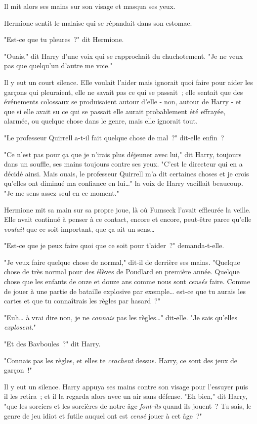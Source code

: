 Il mit alors ses mains sur son visage et masqua ses yeux.

Hermione sentit le malaise qui se répandait dans son estomac.

"Est-ce que tu pleures~?" dit Hermione.

"Ouais," dit Harry d'une voix qui se rapprochait du chuchotement. "Je ne veux pas que quelqu'un d'autre me voie."

Il y eut un court silence. Elle voulait l'aider mais ignorait quoi faire pour aider les garçons qui pleuraient, elle ne savait pas ce qui se passait~; elle sentait que des événements colossaux se produisaient autour d'elle - non, autour de Harry - et que si elle avait su ce qui se passait elle aurait probablement été effrayée, alarmée, ou quelque chose dans le genre, mais elle ignorait tout.

"Le professeur Quirrell a-t-il fait quelque chose de mal~?" dit-elle enfin~?

"Ce n'est pas pour ça que je n'irais plus déjeuner avec lui," dit Harry, toujours dans un souffle, ses mains toujours contre ses yeux. "C'est le directeur qui en a décidé ainsi. Mais ouais, le professeur Quirrell m'a dit certaines choses et je crois qu'elles ont diminué ma confiance en lui…" la voix de Harry vacillait beaucoup. "Je me sens assez seul en ce moment."

Hermione mit sa main sur sa propre joue, là où Fumseck l'avait effleurée la veille. Elle avait continué à penser à ce contact, encore et encore, peut-être parce qu'elle \emph{voulait} que ce soit important, que ça ait un sens…

"Est-ce que je peux faire quoi que ce soit pour t'aider~?" demanda-t-elle.

"Je veux faire quelque chose de normal," dit-il de derrière ses mains. "Quelque chose de très normal pour des élèves de Poudlard en première année. Quelque chose que les enfants de onze et douze ans comme nous sont \emph{censés} faire. Comme de jouer à une partie de bataille explosive par exemple… est-ce que tu aurais les cartes et que tu connaîtrais les règles par hasard~?"

"Euh… à vrai dire non, je ne \emph{connais} pas les règles…" dit-elle. "Je sais qu'elles \emph{explosent}."

"Et des Bavboules~?" dit Harry.

"Connais pas les règles, et elles te \emph{crachent} dessus. Harry, ce sont des jeux de garçon~!"

Il y eut un silence. Harry appuya ses mains contre son visage pour l'essuyer puis il les retira~; et il la regarda alors avec un air sans défense. "Eh bien," dit Harry, "que les sorciers et les sorcières de notre âge \emph{font-ils} quand ils jouent~? Tu sais, le genre de jeu idiot et futile auquel ont est \emph{censé} jouer à cet âge~?"

